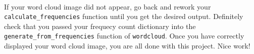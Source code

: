 \documentclass[11pt]{article}
\begin{document}
    \begin{center}
    \end{center}
    { \hspace*{\fill} \\}
    
    If your word cloud image did not appear, go back and rework your
\texttt{calculate\_frequencies} function until you get the desired
output. Definitely check that you passed your frequecy count dictionary
into the \texttt{generate\_from\_frequencies} function of
\texttt{wordcloud}. Once you have correctly displayed your word cloud
image, you are all done with this project. Nice work!


    
    
    
    
\end{document}
